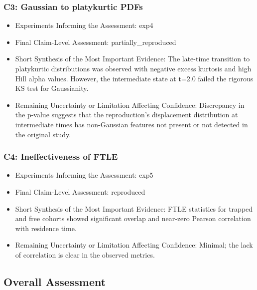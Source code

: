\documentclass[11pt]{article}
\begin{document}
\subsubsection*{C3: Gaussian to platykurtic PDFs}

\begin{itemize}

\item Experiments Informing the Assessment: exp4

\item Final Claim-Level Assessment: partially\_reproduced

\item Short Synthesis of the Most Important Evidence: The late-time transition to platykurtic distributions was observed with negative excess kurtosis and high Hill alpha values. However, the intermediate state at t=2.0 failed the rigorous KS test for Gaussianity.

\item Remaining Uncertainty or Limitation Affecting Confidence: Discrepancy in the p-value suggests that the reproduction's displacement distribution at intermediate times has non-Gaussian features not present or not detected in the original study.

\end{itemize}

\subsubsection*{C4: Ineffectiveness of FTLE}

\begin{itemize}

\item Experiments Informing the Assessment: exp5

\item Final Claim-Level Assessment: reproduced

\item Short Synthesis of the Most Important Evidence: FTLE statistics for trapped and free cohorts showed significant overlap and near-zero Pearson correlation with residence time.

\item Remaining Uncertainty or Limitation Affecting Confidence: Minimal; the lack of correlation is clear in the observed metrics.

\end{itemize}

\subsection*{Overall Assessment}
\end{document}
